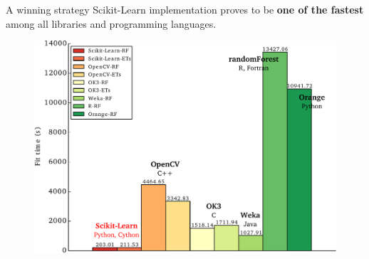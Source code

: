 \documentclass{beamer}
\begin{document}

\begin{frame}{A winning strategy}
Scikit-Learn implementation proves to be {\bf one of the fastest} among all libraries and programming languages.
  \begin{figure}
  \includegraphics[scale=0.5]{./figures/bench.pdf}
  \end{figure}
\end{frame}


\end{document}
